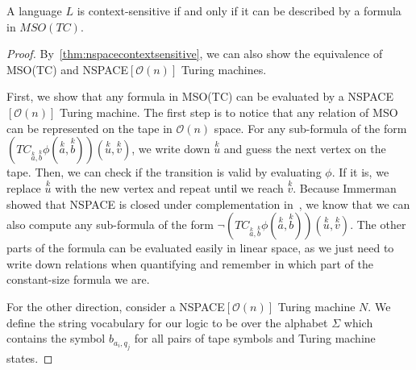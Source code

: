 \begin{theorem}
    \label{thm:contextsensitveMSOTC}
    A language $L$ is context-sensitive if and only if it can be described by a formula in $MSO(TC)$.
\end{theorem}

\begin{proof}
    By~\cref{thm:nspacecontextsensitive}, we can also show the equivalence of MSO(TC) and NSPACE$[\mathcal{O}(n)]$ Turing machines.

    First, we show that any formula in MSO(TC) can be evaluated by a NSPACE$[\mathcal{O}(n)]$ Turing machine.
    The first step is to notice that any relation of MSO can be represented on the tape in $\mathcal{O}(n)$ space.
    For any sub-formula of the form $\left(TC_{\overset{k}{a}, \overset{k}{b}}\phi\left(\overset{k}{a}, \overset{k}{b}\right)\right)\left(\overset{k}{u}, \overset{k}{v}\right)$, we write down $\overset{k}{u}$ and guess the next vertex on the tape.
    Then, we can check if the transition is valid by evaluating $\phi$.
    If it is, we replace $\overset{k}{u}$ with the new vertex and repeat until we reach $\overset{k}{v}$.
    Because Immerman showed that NSPACE is closed under complementation in~\cite{Immerman1988}, we know that we can also compute any sub-formula of the form $\neg\left(TC_{\overset{k}{a}, \overset{k}{b}}\phi\left(\overset{k}{a}, \overset{k}{b}\right)\right)\left(\overset{k}{u}, \overset{k}{v}\right)$.
    The other parts of the formula can be evaluated easily in linear space, as we just need to write down relations when quantifying and remember in which part of the constant-size formula we are.

    \vspace{5mm}

    For the other direction, consider a NSPACE$[\mathcal{O}(n)]$ Turing machine $N$.
    We define the string vocabulary for our logic to be over the alphabet $\Sigma$ which contains the symbol $b_{a_i, q_j}$ for all pairs of tape symbols and Turing machine states.


\end{proof}
